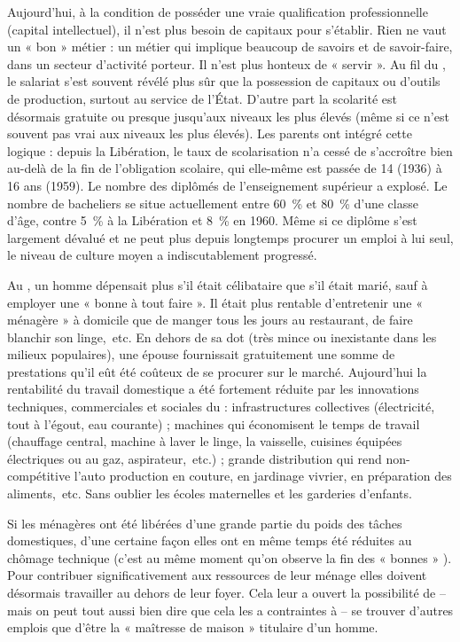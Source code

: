  Aujourd'hui, à la condition de posséder une vraie qualification professionnelle (capital intellectuel), il n'est plus besoin de capitaux pour s'établir. Rien ne vaut un « bon » métier : un métier qui implique beaucoup de savoirs et de savoir-faire, dans un secteur d'activité porteur. Il n'est plus honteux de « servir ». Au fil du , le salariat s'est souvent révélé plus sûr que la possession de capitaux ou d'outils de production, surtout au service de l'État. D'autre part la scolarité est désormais gratuite ou presque jusqu'aux niveaux les plus élevés (même si ce n'est souvent pas vrai aux niveaux les plus élevés). Les parents ont intégré cette logique : depuis la Libération, le taux de scolarisation n'a cessé de s'accroître bien au-delà de la fin de l'obligation scolaire, qui elle-même est passée de 14 (1936) à 16 ans (1959). Le nombre des diplômés de l'enseignement supérieur a explosé. Le nombre de bacheliers se situe actuellement entre 60~\% et 80~\% d'une classe d'âge, contre 5~\% à la Libération et 8~\% en 1960. Même si ce diplôme s'est largement dévalué et ne peut plus depuis longtemps procurer un emploi à lui seul, le niveau de culture moyen a indiscutablement progressé. 

 Au , un homme dépensait plus s'il était célibataire que s'il était marié, sauf à employer une « bonne à tout faire ». Il était plus rentable d'entretenir une « ménagère » à domicile que de manger tous les jours au restaurant, de faire blanchir son linge,~etc. En dehors de sa dot (très mince ou inexistante dans les milieux populaires), une épouse fournissait gratuitement une somme de prestations qu'il eût été coûteux de se procurer sur le marché. Aujourd'hui la rentabilité du travail domestique a été fortement réduite par les innovations techniques, commerciales et sociales du  : infrastructures collectives (électricité, tout à l'égout, eau courante) ; machines qui économisent le temps de travail (chauffage central, machine à laver le linge, la vaisselle, cuisines équipées électriques ou au gaz, aspirateur,~etc.) ; grande distribution qui rend non-compétitive l'auto production en couture, en jardinage vivrier, en préparation des aliments,~etc. Sans oublier les écoles maternelles et les garderies d'enfants. 

 Si les ménagères ont été libérées d'une grande partie du poids des tâches domestiques, d'une certaine façon elles ont en même temps été réduites au chômage technique (c'est au même moment qu'on observe la fin des « bonnes » ). Pour contribuer significativement aux ressources de leur ménage elles doivent désormais travailler au dehors de leur foyer. Cela leur a ouvert la possibilité de -- mais on peut tout aussi bien dire que cela les a contraintes à -- se trouver d'autres emplois que d'être la « maîtresse de maison » titulaire d'un homme. 

